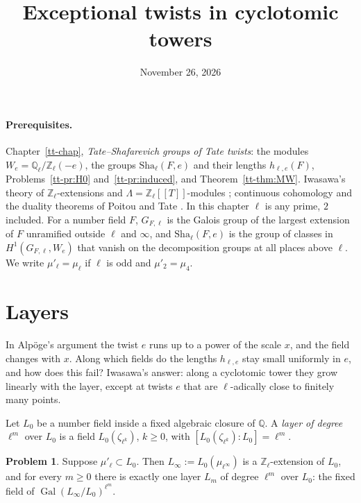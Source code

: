 \documentclass[reqno]{amsart}
\title{Exceptional twists in cyclotomic towers}
\author{}
\date{November 26, 2026}
\newcounter{chap}
\theoremstyle{definition}
\newtheorem{problem}{Problem}[section]
\theoremstyle{plain}
\theoremstyle{remark}
\newcommand{\Z}{\mathbb{Z}}
\newcommand{\Q}{\mathbb{Q}}
\newcommand{\Zl}{\Z_\ell}
\newcommand{\Ql}{\Q_\ell}
\newcommand{\Gal}{\operatorname{Gal}}
\newcommand{\Sha}{\mathrm{Sha}}
\begin{document}
\maketitle
{}\label{chap}

\paragraph{Prerequisites.}
Chapter~\ref{tt-chap}, \emph{Tate--Shafarevich groups of Tate twists}: the modules \(W_e=\Ql/\Zl(-e)\), the groups \(\Sha_\ell(F,e)\) and their lengths \(h_{\ell,e}(F)\), Problems~\ref{tt-pr:H0} and~\ref{tt-pr:induced}, and Theorem~\ref{tt-thm:MW}.  Iwasawa's theory of \(\Zl\)-extensions and \(\Lambda=\Zl[[T]]\)-modules \cite[Ch.~13]{Wa}; continuous cohomology and the duality theorems of Poitou and Tate \cite[Ch.~VII--VIII]{NSW}.  In this chapter \(\ell\) is any prime, \(2\) included.  For a number field \(F\), \(G_{F,\ell}\) is the Galois group of the largest extension of \(F\) unramified outside \(\ell\) and \(\infty\), and \(\Sha_\ell(F,e)\) is the group of classes in \(H^1(G_{F,\ell},W_e)\) that vanish on the decomposition groups at all places above \(\ell\).  We write \(\mu'_\ell=\mu_\ell\) if \(\ell\) is odd and \(\mu'_2=\mu_4\).

\section{Layers}\label{sec:layers}

In Alp\"oge's argument the twist \(e\) runs up to a power of the scale \(x\), and the field changes with \(x\).  Along which fields do the lengths \(h_{\ell,e}\) stay small uniformly in \(e\), and how does this fail?  Iwasawa's answer: along a cyclotomic tower they grow linearly with the layer, except at twists \(e\) that are \(\ell\)-adically close to finitely many points.

Let \(L_0\) be a number field inside a fixed algebraic closure of \(\Q\).  A \emph{layer of degree \(\ell^m\)} over \(L_0\) is a field \(L_0(\zeta_{\ell^k})\), \(k\ge0\), with \([L_0(\zeta_{\ell^k}):L_0]=\ell^m\).

\begin{problem}\label{pr:layer-tower}
Suppose \(\mu'_\ell\subset L_0\).  Then \(L_\infty:=L_0(\mu_{\ell^\infty})\) is a \(\Zl\)-extension of \(L_0\), and for every \(m\ge0\) there is exactly one layer \(L_m\) of degree \(\ell^m\) over \(L_0\): the fixed field of \(\Gal(L_\infty/L_0)^{\ell^m}\).
\end{problem}
\end{document}
